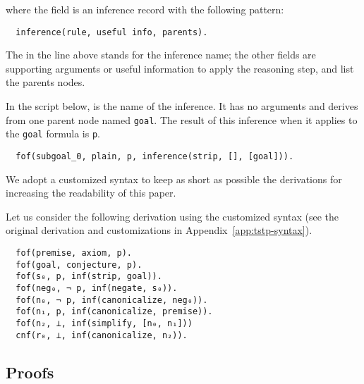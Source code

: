 \documentclass[../main.tex]{subfiles}
\begin{document}
where the  field is an inference record with the following
pattern:

\begin{verbatim}
  inference(rule, useful info, parents).
\end{verbatim}

The  in the line above stands for the inference name;
the other fields are supporting arguments or useful information to
apply the reasoning step, and list the parents nodes.

\begin{myexamplenum}

In the script below, \strip is the name of the inference.
It has no arguments and derives from one parent node named  \verb!goal!. The
result of this inference when it applies to the \verb!goal! formula is
\verb!p!.

\begin{verbatim}
  fof(subgoal_0, plain, p, inference(strip, [], [goal])).
\end{verbatim}
\end{myexamplenum}

\begin{notation}

We adopt a customized \TSTP syntax to keep as short as possible the
\Metis derivations for increasing the readability of this paper.

\begin{myexamplenum}
\label{fig:metis-example-tree}

Let us consider the following \TSTP derivation using
the customized \TSTP syntax (see the original \TSTP derivation and customizations in Appendix~\ref{app:tstp-syntax}).

\begin{verbatim}
  fof(premise, axiom, p).
  fof(goal, conjecture, p).
  fof(s₀, p, inf(strip, goal)).
  fof(neg₀, ¬ p, inf(negate, s₀)).
  fof(n₀, ¬ p, inf(canonicalize, neg₀)).
  fof(n₁, p, inf(canonicalize, premise)).
  fof(n₂, ⊥, inf(simplify, [n₀, n₁]))
  cnf(r₀, ⊥, inf(canonicalize, n₂)).
\end{verbatim}

\end{myexamplenum}
\end{notation}


\subsection{Proofs}
\label{ssec:metis-proofs}
\end{document}
